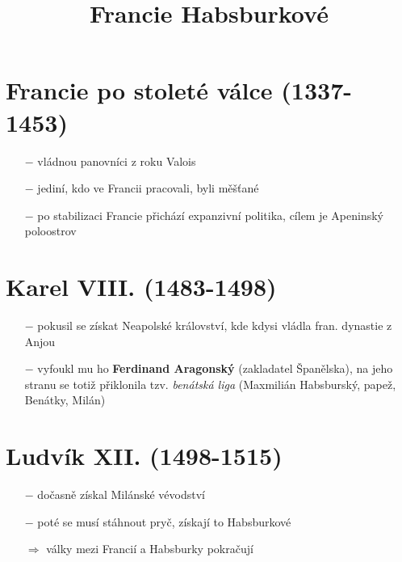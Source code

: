 \documentclass{article}
\title{\vspace{-2cm}Francie Habsburkové\vspace{-1.7cm}}
\date{}
\author{}
\begin{document}
\maketitle

\section*{Francie po stoleté válce (1337-1453)}
\begin{itemize}
    \vspace{-0.5em}
    \setlength\itemsep{0.15em}
    \item[$-$] vládnou panovníci z roku Valois
    \item[$-$] jediní, kdo ve Francii pracovali, byli měšťané
    \item[$-$] po stabilizaci Francie přichází expanzivní politika, cílem je Apeninský poloostrov
\end{itemize}

\section*{Karel VIII. (1483-1498)}
\begin{itemize}
    \vspace{-0.5em}
    \setlength\itemsep{0.15em}
    \item[$-$] pokusil se získat Neapolské království, kde kdysi vládla fran. dynastie z Anjou
    \item[$-$] vyfoukl mu ho \textbf{Ferdinand Aragonský} (zakladatel Španělska), na jeho stranu se totiž přiklonila tzv. \textit{benátská liga} (Maxmilián Habsburský, papež, Benátky, Milán)
\end{itemize}

\section*{Ludvík XII. (1498-1515)}
\begin{itemize}
    \vspace{-0.5em}
    \setlength\itemsep{0.15em}
    \item[$-$] dočasně získal Milánské vévodství
    \item[$-$] poté se musí stáhnout pryč, získají to Habsburkové
    \item[$\Rightarrow$] války mezi Francií a Habsburky pokračují
\end{itemize}
\end{document}
